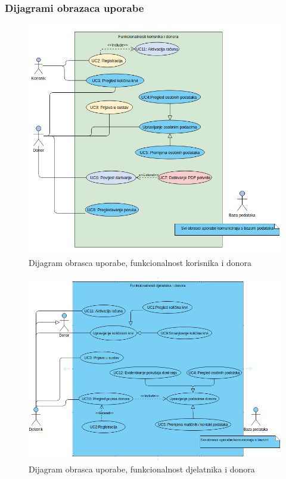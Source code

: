 \subsubsection{Dijagrami obrazaca uporabe}
\begin{figure}[H]
			\includegraphics[scale=0.6]{dijagrami/Funkcionalnosti_korisnika_donora.png} %
			\centering
			\caption{Dijagram obrasca uporabe, funkcionalnost korisnika i donora}
			\label{fig:Funkcionalnosti_korisnika_donora}
\end{figure}

\begin{figure}[H]
			\includegraphics[scale=0.6]{dijagrami/Funkcionalnosti_djelatnika_donora.png} %
			\centering
			\caption{Dijagram obrasca uporabe, funkcionalnost djelatnika i donora}
			\label{fig:Funkcionalnosti_djelatnika_donora}
\end{figure}


